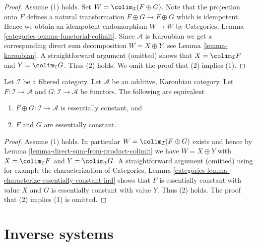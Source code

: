 \begin{proof}
Assume (1) holds. Set $W = \colim_\mathcal{I}(F \oplus G)$.
Note that the projection onto $F$ defines a natural transformation
$F \oplus G \to F \oplus G$ which is idempotent. Hence we obtain
an idempotent endomorphism $W \to W$ by
Categories, Lemma \ref{categories-lemma-functorial-colimit}.
Since $\mathcal{A}$ is Karoubian we get a corresponding direct
sum decomposition $W = X \oplus Y$, see Lemma \ref{lemma-karoubian}.
A straightforward argument (omitted) shows that
$X = \colim_\mathcal{I} F$ and $Y = \colim_\mathcal{I} G$.
Thus (2) holds. We omit the proof that (2) implies (1).
\end{proof}

\begin{lemma}
\label{lemma-direct-sum-from-product-essentially-constant}
Let $\mathcal{I}$ be a filtered category. Let $\mathcal{A}$
be an additive, Karoubian category. Let $F : \mathcal{I} \to \mathcal{A}$ and
$G : \mathcal{I} \to \mathcal{A}$ be functors. The following are equivalent
\begin{enumerate}
\item $F \oplus G : \mathcal{I} \to \mathcal{A}$
is essentially constant, and
\item $F$ and $G$ are essentially constant.
\end{enumerate}
\end{lemma}

\begin{proof}
Assume (1) holds. In particular $W = \colim_\mathcal{I}(F \oplus G)$ exists
and hence by Lemma \ref{lemma-direct-sum-from-product-colimit}
we have $W = X \oplus Y$ with $X = \colim_\mathcal{I} F$ and
$Y = \colim_\mathcal{I} G$. A straightforward argument (omitted)
using for example the characterization of
Categories, Lemma \ref{categories-lemma-characterize-essentially-constant-ind}
shows that $F$ is essentially constant with value $X$ and $G$ is essentially
constant with value $Y$. Thus (2) holds. The proof that (2) implies (1)
is omitted.
\end{proof}






\section{Inverse systems}
\label{section-inverse-systems}

